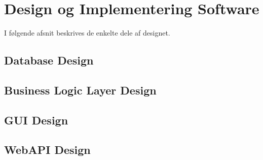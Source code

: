 \section{Design og Implementering Software}
I følgende afsnit beskrives de enkelte dele af designet.

\subsection{Database Design}


\subsection{Business Logic Layer Design}


\subsection{GUI Design}


\subsection{WebAPI Design}
